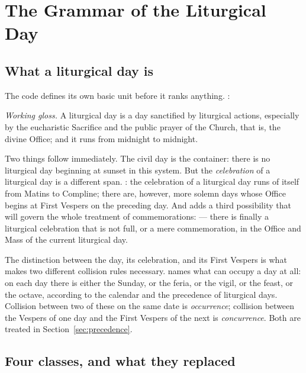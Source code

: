 \section{The Grammar of the Liturgical Day}

\subsection{What a liturgical day is}

The code defines its own basic unit before it ranks anything. :

\begin{studyframe}
\medskip

\textit{Working gloss.} A liturgical day is a day sanctified by liturgical actions, especially
by the eucharistic Sacrifice and the public prayer of the Church, that is, the divine Office;
and it runs from midnight to midnight.
\end{studyframe}

Two things follow immediately. The civil day is the container: there is no liturgical day
beginning at sunset in this system. But the \emph{celebration} of a liturgical day is a
different span. : the celebration of a liturgical day runs of itself from Matins to
Compline; there are, however, more solemn days whose Office begins at First Vespers on the
preceding day. And  adds a third possibility that will govern the whole treatment of
commemorations:  — there is finally a liturgical celebration that is
not full, or a mere commemoration, in the Office and Mass of the current liturgical day.

The distinction between the day, its celebration, and its First Vespers is what makes two
different collision rules necessary.  names what can occupy a day at all: on each day
there is either the Sunday, or the feria, or the vigil, or the feast, or the octave, according
to the calendar and the precedence of liturgical days. Collision between two of these on the
same date is \emph{occurrence}; collision between the Vespers of one day and the First Vespers
of the next is \emph{concurrence}. Both are treated in Section~\ref{sec:precedence}.

\subsection{Four classes, and what they replaced}


